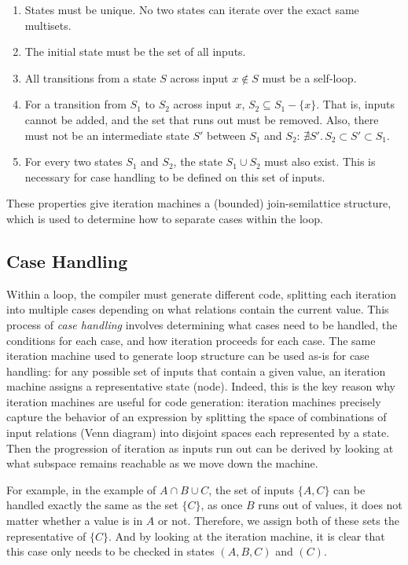 \documentclass[acmsmall,screen,nonacm]{acmart}\settopmatter{printfolios=true,printccs=false,printacmref=false}
\begin{document}
\begin{enumerate}
    \item States must be unique. No two states can iterate over the exact same multisets.
    \item The initial state must be the set of all inputs.
    \item All transitions from a state $S$ across input $x \notin S$
        must be a self-loop.
    \item For a transition from $S_1$ to $S_2$ across input $x$,
        $S_2 \subseteq S_1 - \{x\}$. That is, inputs cannot be added,
        and the set that runs out must be removed. Also, there must
        not be an intermediate state $S'$ between $S_1$ and $S_2$:
        $\nexists S'.\, S_2 \subset S' \subset S_1$. \label{item:im-transition}
    \item For every two states $S_1$ and $S_2$, the state $S_1 \cup S_2$
        must also exist. This is necessary for case handling to be
        defined on this set of inputs.
\end{enumerate}
These properties give iteration machines a (bounded) join-semilattice
structure, which is used to determine how to separate cases within the loop.

\subsection{Case Handling}
Within a loop, the compiler must generate different code, splitting each iteration into multiple cases depending on what relations contain the current value. This process of \emph{case handling} involves determining what cases need to be handled, the conditions for each case, and how iteration proceeds for each case.
The same iteration machine used to generate loop structure can be used
as-is for case handling: for any possible set of inputs that contain
a given value, an iteration machine assigns a representative state
(node).
Indeed, this is the key reason why iteration machines are useful for
code generation: iteration machines precisely capture the behavior of
an expression by splitting the space of combinations of input relations (Venn diagram) into disjoint spaces each
represented by a state. Then the progression of iteration as inputs run out
can be derived by looking at what subspace remains reachable as we move
down the machine.

For example, in the example of $A \cap B \cup C$, the set of inputs
$\{A, C\}$ can be handled exactly the same as the set $\{C\}$, as once
$B$ runs out of values, it does not matter whether a value is in $A$
or not. Therefore, we assign both of these sets the representative of
$\{C\}$. And by looking at the iteration machine, it is clear that this
case only needs to be checked in states $(A, B, C)$ and $(C)$.
\end{document}
